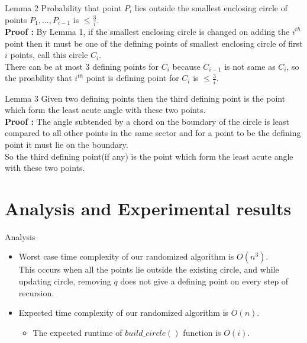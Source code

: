\documentclass{beamer}
\begin{document}
\begin{frame}{Lemma 2}
Probability that point $P_i$ lies outside the smallest enclosing circle of points $P_1, ... , P_{i-1}$ is $\leq \frac{3}{i}$.
\pause
\\
\textbf{Proof : } By Lemma 1, if the smallest enclosing circle is changed on adding the $i^{th}$ point then it must be one of the defining points of smallest enclosing circle of first $i$ points, call this circle $C_i$.
\\
\pause
There can be at most $3$ defining points for $C_i$ because $C_{i-1}$ is not same as $C_i$, so the proability that $i^{th}$ point is defining point for $C_i$ is $\leq \frac{3}{i}$.

\end{frame}
\begin{frame}{Lemma 3}
 Given two defining points then the third defining point is the point which form the least acute angle with these two points.
\pause
\\
\textbf{Proof : } The angle subtended by a chord on the boundary of the circle is least compared to all other points in the same sector and for a point to be the defining point it must lie on the boundary.
\\
\pause
So the third defining point(if any) is the point which form the least acute angle with these two points.    
\end{frame}

\section{Analysis and Experimental results}

\begin{frame}{Analysis}
\begin{itemize}
    \item Worst case time complexity of our randomized algorithm is $O(n^3)$.\\ 
    \pause 
    This occurs when all the points lie outside the existing circle, and while updating circle, removing $q$ does not give a defining point on every step of recursion.
    \pause
    \item Expected time complexity of our randomized algorithm is $O(n)$.
    \pause
    \begin{itemize}
        \item The expected runtime of $build\_circle()$ function is $O(i)$.
    \end{itemize}
\end{itemize}
\end{frame}
\end{document}
